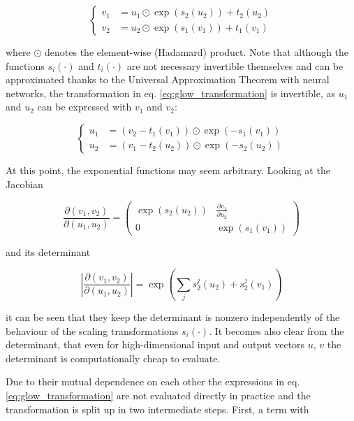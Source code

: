 \begin{equation}
	\left\{\begin{aligned}
		v_1 &= u_1 \odot \exp(s_2(u_2)) + t_2(u_2) \\
		v_2 &= u_2 \odot \exp(s_1(v_1)) + t_1(v_1)
	\end{aligned}\right.
	\label{eq:glow_transformation}
\end{equation}

where $\odot$ denotes the element-wise (Hadamard) product. Note that although the functions $s_i(\cdot)$ and $t_i(\cdot)$ are not necessary invertible themselves and can be approximated thanks to the Universal Approximation Theorem with neural networks, the transformation in eq. \ref{eq:glow_transformation} is invertible, as $u_1$ and $u_2$ can be expressed with $v_1$ and $v_2$:

\begin{equation*}
	\left\{\begin{aligned}
		u_1 &= (v_2 - t_1(v_1)) \odot \exp(-s_1(v_1)) \\
		u_2 &= (v_1 - t_2(u_2)) \odot \exp(-s_2(u_2)) 
	\end{aligned}\right.
\end{equation*}

At this point, the exponential functions may seem arbitrary. Looking at the Jacobian

\begin{equation*}
	\frac{\partial (v_1, v_2)}{\partial(u_1, u_2)} = \left(\begin{matrix}
		\exp(s_2(u_2)) & \frac{\partial v_1}{\partial u_2} \\
		0             & \exp(s_1(v_1))
	\end{matrix}\right)
\end{equation*}

and its determinant

\begin{equation*}
	\left|\frac{\partial (v_1, v_2)}{\partial (u_1, u_2)} \right| = \exp \left(\sum_j s^j_2(u_2) + s^j_2(v_1) \right)
\end{equation*}

it can be seen that they keep the determinant is nonzero independently of the behaviour of the scaling transformations $s_i(\cdot)$. It becomes also clear from the determinant, that even for high-dimensional input and output vectors $u$, $v$ the determinant is computationally cheap to evaluate.

Due to their mutual dependence on each other the expressions in eq. \ref{eq:glow_transformation} are not evaluated directly in practice and the transformation is split up in two intermediate steps. First, a term with

